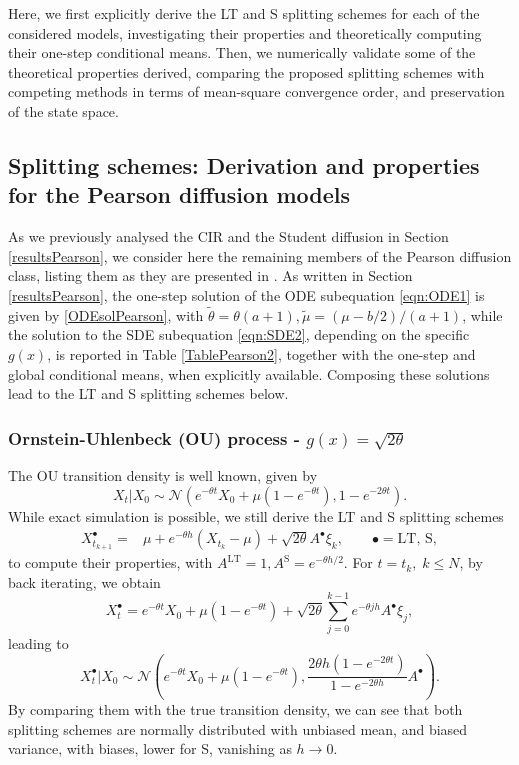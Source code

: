 \documentclass[a4paper,12pt]{article}
\numberwithin{equation}{section}
\theoremstyle{plain}
\theoremstyle{definition}
\begin{document}
\begin{appendix}
\begin{table}
    \label{TablePearson2}
\end{table}
Here, we first explicitly derive the LT and S splitting schemes for each of the considered models, investigating their properties and theoretically computing their one-step conditional means. Then, we numerically validate some of the theoretical properties derived, comparing the proposed splitting schemes with competing methods in terms of mean-square convergence order, and preservation of the state space.

\subsection{Splitting schemes: Derivation and properties for the Pearson diffusion models}
\label{PearsonAppendix}
As we previously analysed the CIR and the Student diffusion in Section \ref{resultsPearson}, we consider here the remaining members of the Pearson diffusion class, listing them as they are presented in \cite{forman_pearson_2008}. As written in Section \ref{resultsPearson}, the one-step solution of the ODE subequation \eqref{eqn:ODE1} is given by \eqref{ODEsolPearson}, with $\tilde\theta=\theta(a+1),\tilde\mu=(\mu-b/2)/(a+1)$, while the solution to the SDE subequation \eqref{eqn:SDE2}, depending on the specific $g(x)$, is reported in Table \ref{TablePearson2}, together with the one-step and global conditional means, when explicitly available. Composing these solutions lead to the LT and S splitting schemes below.

\subsubsection{Ornstein-Uhlenbeck (OU) process - $g(x)=\sqrt{2\theta }$} 
The OU transition density is well known, given by
\begin{equation*}
    X_t|X_0\sim \mathcal{N}\left(e ^{-\theta t}X_0+\mu\left(1-e ^{-\theta t}\right),1-e^{-2\theta t}\right).
\end{equation*}
 While exact simulation is possible, we still derive the LT and S splitting schemes
\begin{align*}
    X^{\bullet}_{t_{k+1}}=&\mu+e^{-\theta h}\left(X_{t_k}-\mu\right)+\sqrt{2\theta}
    A^{\bullet}\xi_k,\qquad \bullet=\textrm{LT, S},
\end{align*}
 to compute their properties, 
with $A^{\textrm{LT}}=1, A^{\textrm{S}}=e^{-\theta h/2}$. 
For $t=t_{k},\; k\leq N$, by back i\-te\-ra\-ting, we obtain
\[
    X^{\bullet}_{t}=e^{-\theta t}X_0+\mu\left(1-e^{-\theta t}\right)+\sqrt{2\theta}\sum_{j=0}^{k-1}e^{-\theta jh}A^{\bullet}\xi_j,
\]
leading to
\[
    X^{\bullet{}}_t|X_0\sim \mathcal{N}\left(e^{-\theta t}X_0+\mu\left(1-e^{-\theta t}\right),\frac{2\theta h \left(1-e^{-2\theta t}\right)}{1-e^{-2\theta h}}A^{\bullet}\right).\label{eqn:OU LT dist}
\]
By comparing them with the true transition density, we can see that both splitting schemes are normally distributed with unbiased mean, and biased variance, with biases, lower for S, vanishing as $h\to 0$.


\end{appendix}
\end{document}
